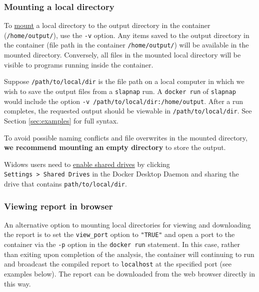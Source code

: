 \documentclass[
]{article}
\begin{document}
\hypertarget{sec:mounting}{%
\subsubsection{Mounting a local directory}\label{sec:mounting}}

To \href{https://docs.docker.com/storage/bind-mounts/}{mount} a local directory to the output directory in the container (\texttt{/home/output/}), use the \texttt{-v} option. Any items saved to the output directory in the container (file path in the container \texttt{/home/output/}) will be available in the mounted directory. Conversely, all files in the mounted local directory will be visible to programs running inside the container.

Suppose \texttt{/path/to/local/dir} is the file path on a local computer in which we wish to save the output files from a \texttt{slapnap} run. A \texttt{docker\ run} of \texttt{slapnap} would include the option \texttt{-v\ /path/to/local/dir:/home/output}. After a run completes, the requested output should be viewable in \texttt{/path/to/local/dir}. See Section \ref{sec:examples} for full syntax.

To avoid possible naming conflicts and file overwrites in the mounted directory, \textbf{we recommend mounting an empty directory} to store the output.

Widows users need to \href{https://docs.docker.com/docker-for-windows/troubleshoot/\#volume-mounting-requires-shared-drives-for-linux-containers}{enable shared drives} by clicking \texttt{Settings\ \textgreater{}\ Shared\ Drives} in the Docker Desktop Daemon and sharing the drive that contains \texttt{path/to/local/dir}.

\hypertarget{sec:viewreport}{%
\subsubsection{Viewing report in browser}\label{sec:viewreport}}

An alternative option to mounting local directories for viewing and downloading the report is to set the \texttt{view\_port} option to \texttt{"TRUE"} and open a port to the container via the \texttt{-p} option in the \texttt{docker\ run} statement. In this case, rather than exiting upon completion of the analysis, the container will continuing to run and broadcast the compiled report to \texttt{localhost} at the specified port (see examples below). The report can be downloaded from the web browser directly in this way.
\end{document}
